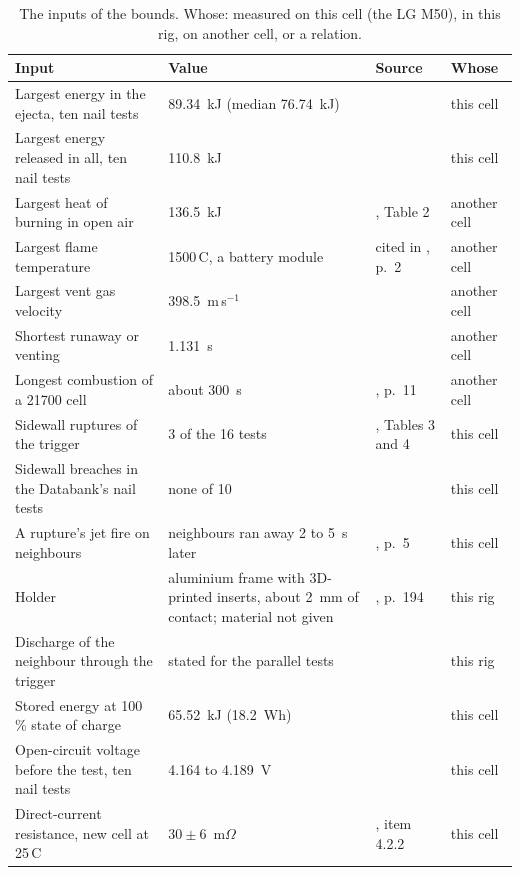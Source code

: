 \documentclass[preprint,12pt]{elsarticle}
\newcommand{\degC}{\,\textdegree C}
\begin{document}
\begin{table}[!htbp]
\centering
\footnotesize
\caption{The inputs of the bounds. Whose: measured on this cell (the LG M50), in this rig, on another cell, or a relation.}
\label{tab:s-inputs}
\renewcommand{\arraystretch}{0.9}
\begin{tabular}{p{}p{}p{}p{}}
\toprule
Input & Value & Source & Whose \\
\midrule
Largest energy in the ejecta, ten nail tests & 89.34~kJ (median 76.74~kJ) & \cite{finegan2024databank} & this cell \\
Largest energy released in all, ten nail tests & 110.8~kJ & \cite{finegan2024databank} & this cell \\
Largest heat of burning in open air & 136.5~kJ & \cite{vendra2022numerical}, Table 2 & another cell \\
Largest flame temperature & 1500\degC, a battery module & cited in \cite{chen2020experimental}, p.~2 & another cell \\
Largest vent gas velocity & 398.5~m\,s$^{-1}$ & \cite{gillich2024mechanical} & another cell \\
Shortest runaway or venting & 1.131~s & \cite{gillich2024mechanical} & another cell \\
Longest combustion of a 21700 cell & about 300~s & \cite{chen2023comprehensive}, p.~11 & another cell \\
Sidewall ruptures of the trigger & 3 of the 16 tests & \cite{fransson2024exploring}, Tables 3 and 4 & this cell \\
Sidewall breaches in the Databank's nail tests & none of 10 & \cite{finegan2024databank} & this cell \\
A rupture's jet fire on neighbours & neighbours ran away 2 to 5~s later & \cite{read2024sidewall}, p.~5 & this cell \\
Holder & aluminium frame with 3D-printed inserts, about 2~mm of contact; material not given & \cite{pfaff2023insitu}, p.~194 & this rig \\
Discharge of the neighbour through the trigger & stated for the parallel tests & \cite{fransson2024exploring} & this rig \\
Stored energy at 100\,\% state of charge & 65.52~kJ (18.2~Wh) & \cite{finegan2024databank} & this cell \\
Open-circuit voltage before the test, ten nail tests & 4.164 to 4.189~V & \cite{finegan2024databank} & this cell \\
Direct-current resistance, new cell at 25\degC & $30\pm6$~m$\Omega$ & \cite{lg2017m50}, item 4.2.2 & this cell \\

\end{tabular}
\end{table}
\end{document}
